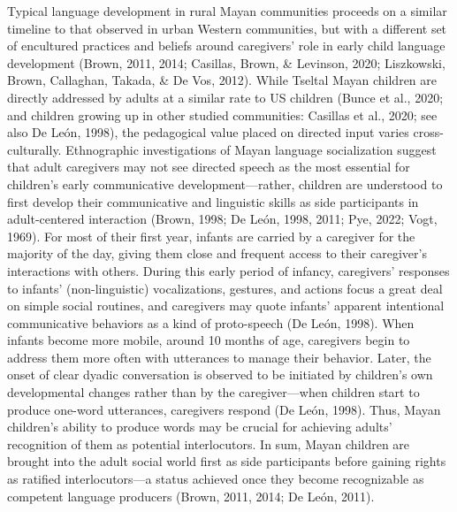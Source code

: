 \documentclass[
  man]{apa6}
\begin{document}
Typical language development in rural Mayan communities proceeds on a similar timeline to that observed in urban Western communities, but with a different set of encultured practices and beliefs around caregivers' role in early child language development (Brown, 2011, 2014; Casillas, Brown, \& Levinson, 2020; Liszkowski, Brown, Callaghan, Takada, \& De Vos, 2012). While Tseltal Mayan children are directly addressed by adults at a similar rate to US children (Bunce et al., 2020; and children growing up in other studied communities: Casillas et al., 2020; see also De León, 1998), the pedagogical value placed on directed input varies cross-culturally. Ethnographic investigations of Mayan language socialization suggest that adult caregivers may not see directed speech as the most essential for children's early communicative development---rather, children are understood to first develop their communicative and linguistic skills as side participants in adult-centered interaction (Brown, 1998; De León, 1998, 2011; Pye, 2022; Vogt, 1969). For most of their first year, infants are carried by a caregiver for the majority of the day, giving them close and frequent access to their caregiver's interactions with others. During this early period of infancy, caregivers' responses to infants' (non-linguistic) vocalizations, gestures, and actions focus a great deal on simple social routines, and caregivers may quote infants' apparent intentional communicative behaviors as a kind of proto-speech (De León, 1998). When infants become more mobile, around 10 months of age, caregivers begin to address them more often with utterances to manage their behavior. Later, the onset of clear dyadic conversation is observed to be initiated by children's own developmental changes rather than by the caregiver---when children start to produce one-word utterances, caregivers respond (De León, 1998). Thus, Mayan children's ability to produce words may be crucial for achieving adults' recognition of them as potential interlocutors. In sum, Mayan children are brought into the adult social world first as side participants before gaining rights as ratified interlocutors---a status achieved once they become recognizable as competent language producers (Brown, 2011, 2014; De León, 2011).
\end{document}
